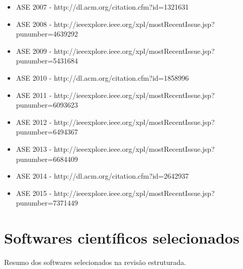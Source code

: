 \begin{itemize}
  \item ASE 2007 - {\small http://dl.acm.org/citation.cfm?id=1321631}
  \item ASE 2008 - {\small http://ieeexplore.ieee.org/xpl/mostRecentIssue.jsp?punumber=4639292}
  \item ASE 2009 - {\small http://ieeexplore.ieee.org/xpl/mostRecentIssue.jsp?punumber=5431684}
  \item ASE 2010 - {\small http://dl.acm.org/citation.cfm?id=1858996}
  \item ASE 2011 - {\small http://ieeexplore.ieee.org/xpl/mostRecentIssue.jsp?punumber=6093623}
  \item ASE 2012 - {\small http://ieeexplore.ieee.org/xpl/mostRecentIssue.jsp?punumber=6494367}
  \item ASE 2013 - {\small http://ieeexplore.ieee.org/xpl/mostRecentIssue.jsp?punumber=6684409}
  \item ASE 2014 - {\small http://dl.acm.org/citation.cfm?id=2642937}
  \item ASE 2015 - {\small http://ieeexplore.ieee.org/xpl/mostRecentIssue.jsp?punumber=7371449}
\end{itemize}

\section{Softwares científicos selecionados}
\label{softwares-cientificos}

Resumo dos softwares selecionados na revisão estruturada.

